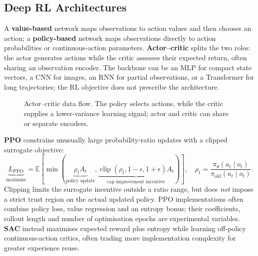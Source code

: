 \subsection{Deep RL Architectures}\label{sec:rl-architectures}
A \textbf{value-based} network maps observations to action values and then chooses an action; a \textbf{policy-based} network maps observations directly to action probabilities or continuous-action parameters.
\textbf{Actor--critic} splits the two roles: the actor generates actions while the critic assesses their expected return, often sharing an observation encoder.
The backbone can be an MLP for compact state vectors, a CNN for images, an RNN for partial observations, or a Transformer for long trajectories; the RL objective does not prescribe the architecture.

\begin{figure}[!htbp]\centering
{}
\caption{Actor--critic data flow. The policy selects actions, while the critic supplies a lower-variance learning signal; actor and critic can share or separate encoders.}
\end{figure}
\textbf{PPO} constrains unusually large probability-ratio updates with a clipped surrogate objective:
\[
\underbrace{L_{\mathrm{PPO}}}_{\text{maximise}}
=\mathbb E\!\left[\min\!\left(
\underbrace{\rho_t A_t}_{\text{policy update}},
\underbrace{\operatorname{clip}(\rho_t,1-\epsilon,1+\epsilon)A_t}_{\text{cap improvement incentive}}\right)\right],\quad
\rho_t=\frac{\pi_{\theta}(a_t\mid o_t)}{\pi_{\mathrm{old}}(a_t\mid o_t)}.
\]
Clipping limits the surrogate incentive outside a ratio range, but does \emph{not} impose a strict trust region on the actual updated policy.
PPO implementations often combine policy loss, value regression and an entropy bonus; their coefficients, rollout length and number of optimisation epochs are experimental variables.
\textbf{SAC} instead maximises expected reward plus entropy while learning off-policy continuous-action critics, often trading more implementation complexity for greater experience reuse.

